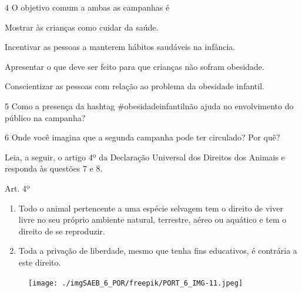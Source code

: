 \num{4} O objetivo comum a ambas as campanhas é

\begin{escolha}
\item Mostrar às crianças como cuidar da saúde.
\item Incentivar as pessoas a manterem hábitos saudáveis na infância.
\item Apresentar o que deve ser feito para que crianças não sofram
obesidade.
\item Conscientizar as pessoas com relação ao problema da obesidade
infantil. 
\end{escolha}


\num{5} Como a presença da hashtag \#obesidadeinfantilnão ajuda no
envolvimento do público na campanha?


\num{6} Onde você imagina que a segunda campanha pode ter circulado? Por
quê?


Leia, a seguir, o artigo 4º da Declaração Universal dos Direitos dos
Animais e responda às questões 7 e 8.\enlargethispage{2\baselineskip}

\begin{myquote}
Art. 4º
\begin{enumerate}
\item Todo o animal pertencente a uma espécie selvagem tem o direito de
viver livre no seu próprio ambiente natural, terrestre, aéreo ou
aquático e tem o direito de se reproduzir.
\item Toda a privação de liberdade, mesmo que tenha fins educativos, é
contrária a este direito.
\end{enumerate}

\begin{figure}[H]
\centering\texttt{[image: ./imgSAEB\_6\_POR/freepik/PORT\_6\_IMG-11.jpeg]}
\end{figure}

\end{myquote}


